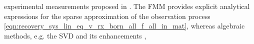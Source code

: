 experimental measurements proposed in
\cite{article:Ghanbarzadeh-DagheyanSensors2018,article:BerthonPMB2018}.
The \ac{FMM} provides
explicit analytical expressions for
the sparse approximation of
the observation process
\eqref{eqn:recovery_sys_lin_eq_v_rx_born_all_f_all_in_mat}, whereas
algebraic methods, e.g.
the \acl{SVD}
\cite{book:Hansen2010,book:Hansen1998} and
its enhancements
\cite{article:ChaillatJCP2012},
